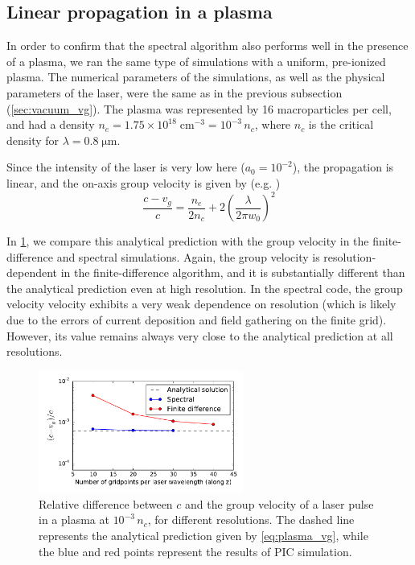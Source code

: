 \documentclass[1p,times,authoryear]{elsarticle}
\begin{document}
\subsection{Linear propagation in a plasma}
\label{sec:linear_plasma}

In order to confirm that the spectral algorithm also performs well in
the presence of a plasma, we ran the same type of simulations with a
uniform, pre-ionized plasma. The numerical parameters of the
simulations, as well as the physical parameters of the laser, 
were the same as in the previous subsection
(\cref{sec:vacuum_vg}). The plasma was represented by 16
macroparticles per cell, and had a density $n_e = 1.75\times
10^{18}\;\mathrm{cm}^{-3} = 10^{-3}\,n_c$, where $n_c$ is the critical
density for $\lambda=0.8\;\mathrm{\mu m}$.

Since the intensity of the laser is very low here ($a_0 = 10^{-2}$),
the propagation is linear, and the on-axis group velocity is given by
(e.g. \citep{Esarey1999})
\begin{equation} 
\label{eq:plasma_vg}
\frac{c-v_g}{c} = \frac{n_e}{2n_c} + 2\left( \frac{\lambda}{2\pi w_0} \right)^2
\end{equation}

In \cref{fig:Plasma_vg}, we compare this analytical prediction with the group velocity in the
finite-difference and spectral simulations. Again, the
group velocity is resolution-dependent in the finite-difference
algorithm, and it is substantially different than the analytical
prediction even at high resolution. In the spectral code, the group
velocity velocity exhibits a very weak dependence on resolution
(which is likely due to the errors of current deposition and field
gathering on the finite grid). However, its value remains always very
close to the analytical prediction at all resolutions.

\begin{figure}[!h]
\centering
\includegraphics[width=0.6\textwidth]{figures/Plasma_vg.pdf}
\caption{\label{fig:Plasma_vg}Relative difference between $c$ and the
group velocity of a laser pulse in a plasma at $10^{-3}\,n_c$, for different
resolutions. The dashed line represents
the analytical prediction given by \cref{eq:plasma_vg}, while the blue
and red points represent the results of PIC simulation.}
\end{figure}
\end{document}
